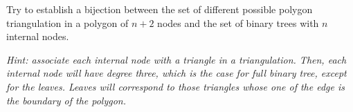 
\begin{ex}
\item Try to establish a bijection between the set of different possible polygon triangulation in a polygon of $n+2$ nodes and the set of binary trees with $n$ internal nodes.

\textit{Hint: associate each internal node with a triangle in a triangulation. Then, each internal node will have degree three, which is the case for full binary tree, except for the leaves. Leaves will correspond to those triangles whose one of the edge is the boundary of the polygon.}
\end{ex}

 

